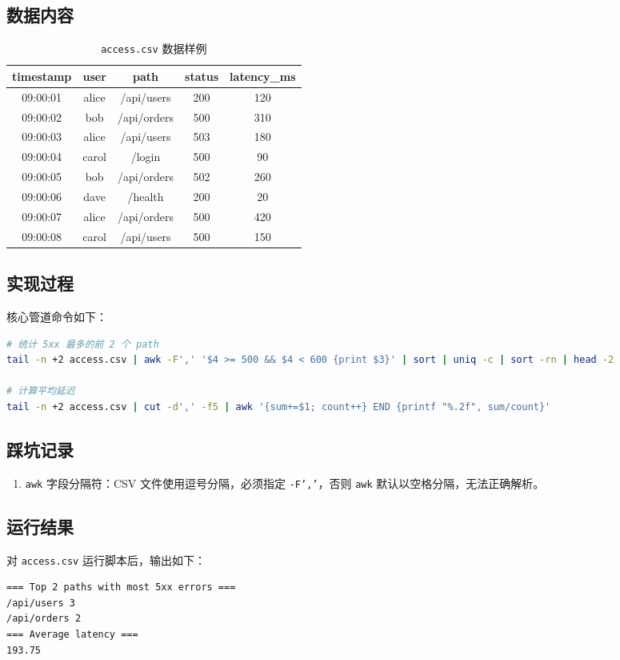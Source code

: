 \documentclass[12pt, a4paper]{article}
\numberwithin{equation}{section}
\begin{document}
\subsection{数据内容}
\begin{table}[H]
\centering
\caption{\texttt{access.csv} 数据样例}\label{tab:q2data}
\begin{tabular}{|c|c|c|c|c|}
\hline
\textbf{timestamp} & \textbf{user} & \textbf{path} & \textbf{status} & \textbf{latency\_ms} \\
\hline
09:00:01 & alice & /api/users & 200 & 120 \\
09:00:02 & bob & /api/orders & 500 & 310 \\
09:00:03 & alice & /api/users & 503 & 180 \\
09:00:04 & carol & /login & 500 & 90 \\
09:00:05 & bob & /api/orders & 502 & 260 \\
09:00:06 & dave & /health & 200 & 20 \\
09:00:07 & alice & /api/orders & 500 & 420 \\
09:00:08 & carol & /api/users & 500 & 150 \\
\hline
\end{tabular}
\end{table}

\subsection{实现过程}
核心管道命令如下：
\begin{lstlisting}[language=bash, caption=5xx 统计与平均延迟计算]
# 统计 5xx 最多的前 2 个 path
tail -n +2 access.csv | awk -F',' '$4 >= 500 && $4 < 600 {print $3}' | sort | uniq -c | sort -rn | head -2

# 计算平均延迟
tail -n +2 access.csv | cut -d',' -f5 | awk '{sum+=$1; count++} END {printf "%.2f", sum/count}'
\end{lstlisting}

\subsection{踩坑记录}
\begin{enumerate}
    \item \texttt{awk} 字段分隔符：CSV 文件使用逗号分隔，必须指定 \texttt{-F','}，否则 \texttt{awk} 默认以空格分隔，无法正确解析。    
\end{enumerate}

\subsection{运行结果}
对 \texttt{access.csv} 运行脚本后，输出如下：
\begin{verbatim}
=== Top 2 paths with most 5xx errors ===
/api/users 3
/api/orders 2
=== Average latency ===
193.75
\end{verbatim}
\end{document}
